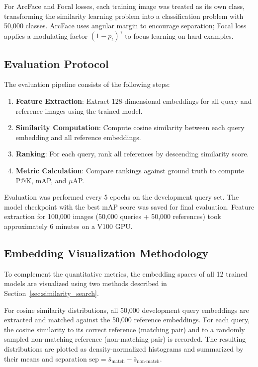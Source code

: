 \documentclass[
    english,
]{VUMIFPSbakalaurinis}
\begin{document}
For ArcFace and Focal losses, each training image was treated as its own class, transforming the similarity learning problem into a classification problem with 50,000 classes. ArcFace uses angular margin to encourage separation; Focal loss applies a modulating factor $(1-p_t)^\gamma$ to focus learning on hard examples.

\subsection{Evaluation Protocol}

The evaluation pipeline consists of the following steps:

\begin{enumerate}
    \item \textbf{Feature Extraction}: Extract 128-dimensional embeddings for all query and reference images using the trained model.
    \item \textbf{Similarity Computation}: Compute cosine similarity between each query embedding and all reference embeddings.
    \item \textbf{Ranking}: For each query, rank all references by descending similarity score.
    \item \textbf{Metric Calculation}: Compare rankings against ground truth to compute P@K, mAP, and $\mu$AP.
\end{enumerate}

Evaluation was performed every 5 epochs on the development query set. The model checkpoint with the best mAP score was saved for final evaluation. Feature extraction for 100,000 images (50,000 queries + 50,000 references) took approximately 6 minutes on a V100 GPU.

\subsection{Embedding Visualization Methodology}

To complement the quantitative metrics, the embedding spaces of all 12 trained models are visualized using two methods described in Section~\ref{sec:similarity_search}.

For cosine similarity distributions, all 50,000 development query embeddings are extracted and matched against the 50,000 reference embeddings. For each query, the cosine similarity to its correct reference (matching pair) and to a randomly sampled non-matching reference (non-matching pair) is recorded. The resulting distributions are plotted as density-normalized histograms and summarized by their means and separation $\text{sep} = \bar{s}_{\text{match}} - \bar{s}_{\text{non-match}}$.
\end{document}
